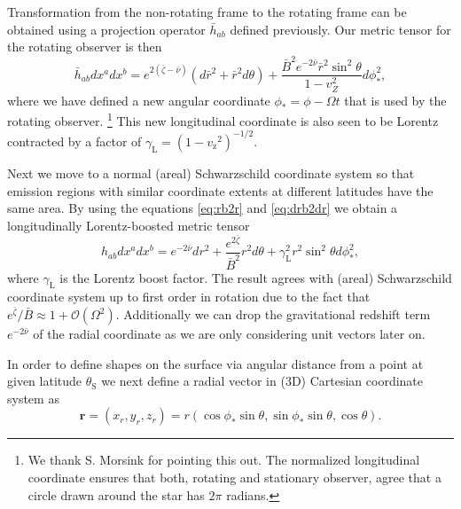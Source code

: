 \documentclass[iop, usenatbib]{emulateapj}
\newcommand{\be}{\begin{equation}}
\newcommand{\ee}{\end{equation}}
\renewcommand{\vec}[1]{\ensuremath{\boldsymbol{#1}}​}
\newcommand{\sch}{Schwarzschild }
\newcommand{\rb}{\ensuremath{\bar{r}}}
\newcommand{\nub}{\ensuremath{\bar{\nu}}}
\newcommand{\zetab}{\ensuremath{\bar{\zeta}}}
\newcommand{\Bb}{\ensuremath{\bar{B}}}
\newcommand{\vz}{\ensuremath{v_{\mathrm{z}}}}
\newcommand{\lgamma}{\gamma_{\text{L}}}
\begin{document}
Transformation from the non-rotating frame to the rotating frame can be obtained using a projection operator $\bar{h}_{ab}$ defined previously.
Our metric tensor for the rotating observer is then
\be
\bar{h}_{ab} dx^a dx^b = e^{2(\zetab - \nub)} (d\rb^2 + \rb^2 d\theta) + \frac{\Bb^2 e^{-2\nub} \rb^2 \sin^2\theta}{1-v_Z^2} d\phi_*^2,
\ee
where we have defined a new angular coordinate $\phi_* = \phi - \Omega t$ that is used by the rotating observer.%
\footnote{We thank S. Morsink for pointing this out. 
The normalized longitudinal coordinate ensures that both, rotating and stationary observer, agree that a circle drawn around the star has $2\pi$ radians.}
This new longitudinal coordinate is also seen to be Lorentz contracted by a factor of $\gamma_\mathrm{L} = (1-\vz^2)^{-1/2}$.

Next we move to a normal (areal) \sch coordinate system so that emission regions with similar coordinate extents at different latitudes have the same area.
By using the equations \eqref{eq:rb2r} and \eqref{eq:drb2dr} we obtain a longitudinally Lorentz-boosted metric tensor 
\be \label{eq:gammaSch} 
h_{ab} dx^a dx^b = e^{-2\nub}dr^2 + \frac{e^{2\zetab}}{\Bb^2} r^2 d\theta + \lgamma^2 r^2 \sin^2\theta d\phi_*^2, 
\ee 
where $\gamma_\text{L}$ is the Lorentz boost factor.
The result agrees with (areal) \sch coordinate system up to first order in rotation due to the fact that $e^{\zetab}/\Bb \approx 1 + \mathcal{O}(\Omega^2)$.  
Additionally we can drop the gravitational redshift term $e^{-2\nub}$ of the radial coordinate as we are only considering unit vectors later on.

In order to define shapes on the surface via angular distance from a point at given latitude $\theta_{\mathrm{S}}$ we next define a radial vector in (3D) Cartesian coordinate system as 
\be
\vec{r} = (x_r, y_r, z_r) = r (\cos\phi_* \sin\theta, \sin\phi_* \sin\theta, \cos\theta).
\ee
\end{document}
